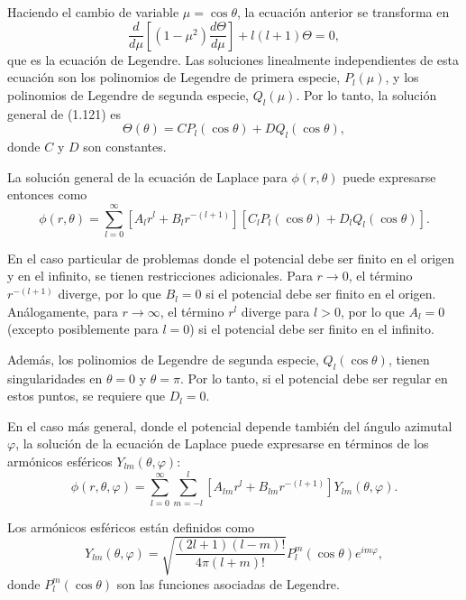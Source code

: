 \documentclass[12pt,a4paper]{book}
\begin{document}
Haciendo el cambio de variable $\mu = \cos\theta$, la ecuación anterior se transforma en
\begin{equation}
\frac{d}{d\mu}\left[(1-\mu^2)\frac{d\Theta}{d\mu}\right] + l(l+1)\Theta = 0,
\end{equation}
que es la ecuación de Legendre. Las soluciones linealmente independientes de esta ecuación son los polinomios de Legendre de primera especie, $P_l(\mu)$, y los polinomios de Legendre de segunda especie, $Q_l(\mu)$. Por lo tanto, la solución general de (1.121) es
\begin{equation}
\Theta(\theta) = CP_l(\cos\theta) + DQ_l(\cos\theta),
\end{equation}
donde $C$ y $D$ son constantes.

La solución general de la ecuación de Laplace para $\phi(r, \theta)$ puede expresarse entonces como
\begin{equation}
\phi(r, \theta) = \sum_{l=0}^{\infty}\left[A_l r^l + B_l r^{-(l+1)}\right]\left[C_l P_l(\cos\theta) + D_l Q_l(\cos\theta)\right].
\end{equation}

En el caso particular de problemas donde el potencial debe ser finito en el origen y en el infinito, se tienen restricciones adicionales. Para $r \to 0$, el término $r^{-(l+1)}$ diverge, por lo que $B_l = 0$ si el potencial debe ser finito en el origen. Análogamente, para $r \to \infty$, el término $r^l$ diverge para $l > 0$, por lo que $A_l = 0$ (excepto posiblemente para $l = 0$) si el potencial debe ser finito en el infinito.

Además, los polinomios de Legendre de segunda especie, $Q_l(\cos\theta)$, tienen singularidades en $\theta = 0$ y $\theta = \pi$. Por lo tanto, si el potencial debe ser regular en estos puntos, se requiere que $D_l = 0$.

En el caso más general, donde el potencial depende también del ángulo azimutal $\varphi$, la solución de la ecuación de Laplace puede expresarse en términos de los armónicos esféricos $Y_{lm}(\theta, \varphi)$:
\begin{equation}
\phi(r, \theta, \varphi) = \sum_{l=0}^{\infty}\sum_{m=-l}^{l}\left[A_{lm}r^l + B_{lm}r^{-(l+1)}\right]Y_{lm}(\theta, \varphi).
\end{equation}

Los armónicos esféricos están definidos como
\begin{equation}
Y_{lm}(\theta, \varphi) = \sqrt{\frac{(2l+1)(l-m)!}{4\pi(l+m)!}}P_l^m(\cos\theta)e^{im\varphi},
\end{equation}
donde $P_l^m(\cos\theta)$ son las funciones asociadas de Legendre.
\end{document}
